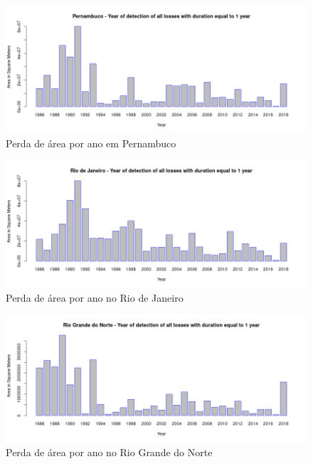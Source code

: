 \begin{appendices}
\begin{figure}[H]
    \centering
    \includegraphics[scale=.5]{images/loss_graphics/Pernambuco_loss_eq1.png}
    \caption{Perda de área por ano em Pernambuco}
    \label{fig:loss_pernambuco}
\end{figure}

\begin{figure}[H]
    \centering
    \includegraphics[scale=.5]{images/loss_graphics/Rio de Janeiro_loss_eq1.png}
    \caption{Perda de área por ano no Rio de Janeiro}
    \label{fig:loss_rio_de_janeiro}
\end{figure}

\begin{figure}[H]
    \centering
    \includegraphics[scale=.5]{images/loss_graphics/Rio Grande do Norte_loss_eq1.png}
    \caption{Perda de área por ano no Rio Grande do Norte}
    \label{fig:loss_rio_grande_do_norte}
\end{figure}


\end{appendices}
